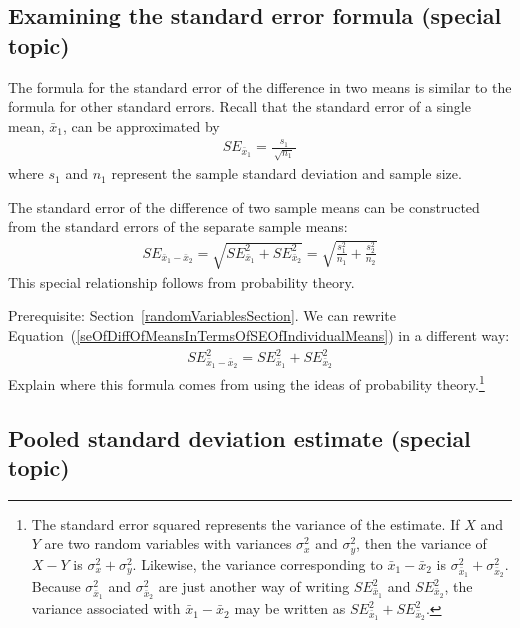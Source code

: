 {\subsection{Examining the standard error formula (special topic)}

The formula for the standard error of the difference in two means is similar to the formula for other standard errors. Recall that the standard error of a single mean, $\bar{x}_1$, can be approximated by\textC{\vspace{-3mm}}
\begin{align*}
SE_{\bar{x}_1} = \frac{s_1}{\ \sqrt{n_1}\ }
\end{align*}
where $s_1$ and $n_1$ represent the sample standard deviation and sample size.

The standard error of the difference of two sample means can be constructed from the standard errors of the separate sample means:
\begin{eqnarray}
SE_{\bar{x}_{1} - \bar{x}_{2}}
	= \sqrt{SE_{\bar{x}_1}^2 + SE_{\bar{x}_2}^2}
	= \sqrt{\frac{s_1^2}{{n_1}} + \frac{s_2^2}{{n_2}}}
\label{seOfDiffOfMeansInTermsOfSEOfIndividualMeans}
\end{eqnarray}
This special relationship follows from probability theory.

\begin{exercise}\label{derivingSEForDiffOfTwoMeansExercise}
Prerequisite: Section~\ref{randomVariablesSection}.
We can rewrite Equation~(\ref{seOfDiffOfMeansInTermsOfSEOfIndividualMeans}) in a different way:
\begin{eqnarray*}
SE_{\bar{x}_{1} - \bar{x}_{2}}^2 = SE_{\bar{x}_1}^2 + SE_{\bar{x}_2}^2
\end{eqnarray*}
Explain where this formula comes from using the ideas of probability theory.\footnote{The standard error squared represents the variance of the estimate. If $X$ and $Y$ are two random variables with variances $\sigma_x^2$ and $\sigma_y^2$, then the variance of $X-Y$ is $\sigma_x^2 + \sigma_y^2$. Likewise, the variance corresponding to $\bar{x}_1 - \bar{x}_2$ is $\sigma_{\bar{x}_1}^2 + \sigma_{\bar{x}_2}^2$. Because $\sigma_{\bar{x}_1}^2$ and $\sigma_{\bar{x}_2}^2$ are just another way of writing $SE_{\bar{x}_1}^2$ and  $SE_{\bar{x}_2}^2$, the variance associated with $\bar{x}_1 - \bar{x}_2$ may be written as $SE_{\bar{x}_1}^2 + SE_{\bar{x}_2}^2$.}
\end{exercise}


\subsection{Pooled standard deviation estimate (special topic)}
\label{pooledStandardDeviations}

}
